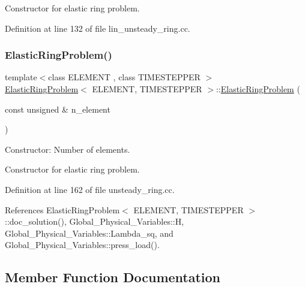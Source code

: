 Constructor for elastic ring problem. 

Definition at line 132 of file lin\+\_\+unsteady\+\_\+ring.\+cc.

\mbox{\label{classElasticRingProblem_a35ea54990c8b848aebcbb635b8c5be8e}} 
\subsubsection{\texorpdfstring{Elastic\+Ring\+Problem()}{ElasticRingProblem()}\hspace{0.1cm}{\footnotesize\ttfamily [2/2]}}
{\footnotesize\ttfamily template$<$class E\+L\+E\+M\+E\+NT , class T\+I\+M\+E\+S\+T\+E\+P\+P\+ER $>$ \\
\hyperlink{classElasticRingProblem}{Elastic\+Ring\+Problem}$<$ E\+L\+E\+M\+E\+NT, T\+I\+M\+E\+S\+T\+E\+P\+P\+ER $>$\+::\hyperlink{classElasticRingProblem}{Elastic\+Ring\+Problem} (\begin{DoxyParamCaption}\item[{const unsigned \&}]{n\+\_\+element }\end{DoxyParamCaption})}



Constructor\+: Number of elements. 

Constructor for elastic ring problem. 

Definition at line 162 of file unsteady\+\_\+ring.\+cc.



References Elastic\+Ring\+Problem$<$ E\+L\+E\+M\+E\+N\+T, T\+I\+M\+E\+S\+T\+E\+P\+P\+E\+R $>$\+::doc\+\_\+solution(), Global\+\_\+\+Physical\+\_\+\+Variables\+::H, Global\+\_\+\+Physical\+\_\+\+Variables\+::\+Lambda\+\_\+sq, and Global\+\_\+\+Physical\+\_\+\+Variables\+::press\+\_\+load().



\subsection{Member Function Documentation}
\mbox{\label{classElasticRingProblem_ab0eb0dcecfa7e9c9e52ecf319f6e873e}} 
